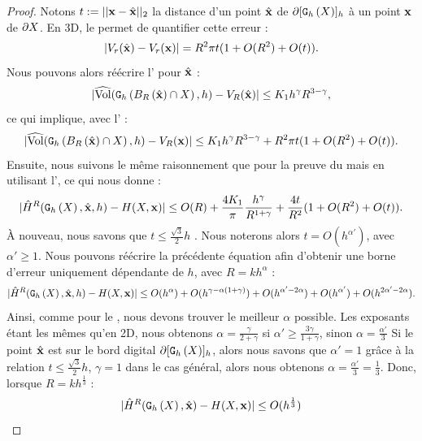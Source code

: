 \begin{proof}
%
Notons $t \EqDef ||\vx-\vxH||_2$ la distance d'un point $\vxH$ de
$\Bd{\Body{\DSh}{h}}$ à un point $\vx$ de $\dS$. En 3D, le
 permet de quantifier cette erreur :
%
\begin{equation}\label{eq:volume-shift-error-2}
  | V_r(\vxH) - V_r(\vx) | = R^2 \pi t (1 + O(R^2)+O(t)).
\end{equation}
%
Nous pouvons alors réécrire l'
pour $\vxH$ :
%
\begin{equation}
  | \VolC(\DigF{\Ball{R}{\vxH} \cap \Shape}{h}, h) - V_R(\vxH) | \le K_1 h^\gamma R^{3-\gamma},
\end{equation}
%
ce qui implique, avec l' :
%
\begin{equation}\label{eq:shift-B-R-error-bound-3D}
  | \VolC(\DigF{\Ball{R}{\vxH} \cap \Shape}{h}, h) - V_R(\vx) |  \le K_1 h^\gamma R^{3-\gamma} +  R^2 \pi t (1 + O(R^2) + O(t)).
\end{equation}
%
Ensuite, nous suivons le même raisonnement que pour la preuve du
 mais en utilisant
l', ce qui nous donne :
%
\begin{equation}\label{eq:shift-curvhat-error-bound-3D}
  | \MeanCurvH{R}(\DSh,\vxH,h) - \MeanCurv(\Shape,\vx) | \le O(R) + \frac{4 K_1}{\pi} \frac{h^\gamma}{R^{1+\gamma}} + \frac{4 t}{R^2}(1 + O(R^2) + O(t)).
\end{equation}
%
À nouveau, nous savons que $t \le \frac{\sqrt{3}}{2}h$ \cite{Lachaud2015}. Nous noterons alors
$t = O(h^{\alpha'})$, avec $\alpha' \ge 1$. Nous pouvons réécrire la
précédente équation afin d'obtenir une borne d'erreur uniquement dépendante de
$h$, avec $R=kh^{\alpha}$ :
%
\begin{equation} \label{eq:shift-meancurvhat-error-bound-h-only}
  | \MeanCurvH{R}(\DSh,\vxH,h) - \MeanCurv(\Shape,\vx) |
  \le O(h^\alpha) + O(h^{\gamma-\alpha(1+\gamma)}) + O(h^{\alpha'-2\alpha})
    + O(h^{\alpha'}) + O(h^{2\alpha'-2\alpha}).
\end{equation}
%
Ainsi, comme pour le , nous devons trouver
le meilleur $\alpha$ possible. Les exposants étant les mêmes qu'en 2D, nous
obtenons $\alpha = \frac{\gamma}{2 + \gamma}$ si $\alpha' \ge \frac{3 \gamma}{1 +
\gamma}$, sinon $\alpha = \frac{\alpha'}{3}$
%
Si le point $\vxH$ est sur le bord digital $\Bd{\Body{\DSh}{h}}$, alors nous
savons que $\alpha'=1$ grâce à la relation $t \le \frac{\sqrt{3}}{2}h$, $\gamma =
1$ dans le cas général, alors nous obtenons $\alpha = \frac{\alpha'}{3} =
\frac{1}{3}$. Donc, lorsque $R = kh^{\frac{1}{3}}$ :
%
\begin{equation}
  | \MeanCurvH{R}(\DSh,\vxH) - \MeanCurv(\Shape,\vx) | \le O(h^{\frac{1}{3}})
\end{equation}
%
\end{proof}

